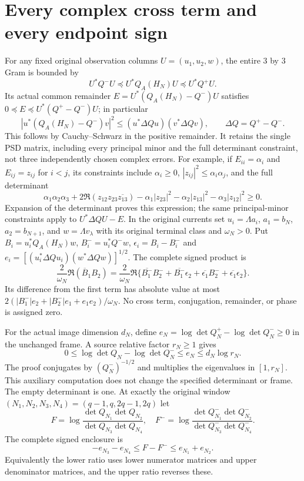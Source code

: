 \documentclass[11pt]{article}
\begin{document}
\section{Every complex cross term and every endpoint sign}

For any fixed original observation columns $U=(u_1,u_2,w)$,
the entire $3$ by $3$ Gram is bounded by
\[
 U^*Q^-U\preceq U^*Q_A(H_N)U\preceq U^*Q^+U.
\]
Its actual common remainder $E=U^*(Q_A(H_N)-Q^-)U$ satisfies
$0\preceq E\preceq U^*(Q^+-Q^-)U$; in particular
\begin{equation}\label{eq:cross}
 |u^*(Q_A(H_N)-Q^-)v|^2
 \le(u^*\Delta Q u)(v^*\Delta Q v),\qquad\Delta Q=Q^+-Q^-.
\end{equation}
This follows by Cauchy--Schwarz in the positive remainder. It
retains the single PSD matrix, including every principal minor and
the full determinant constraint, not three independently chosen
complex errors. For example, if $E_{ii}=\alpha_i$ and
$E_{ij}=z_{ij}$ for $i<j$, its constraints include $\alpha_i\ge0$,
$|z_{ij}|^2\le\alpha_i\alpha_j$, and the full determinant
\[
 \alpha_1\alpha_2\alpha_3
 +2\Re(z_{12}z_{23}\overline{z_{13}})
 -\alpha_1|z_{23}|^2-\alpha_2|z_{13}|^2-\alpha_3|z_{12}|^2
 \ge0.
\]
Expansion of the determinant proves this expression; the same
principal-minor constraints apply to $U^*\Delta Q U-E$.
In the original currents set
$u_i=\Lambda a_i$, $a_1=b_N$, $a_2=b_{N+1}$, and
$w=\Lambda v_\lambda$ with its original terminal class and
$\omega_N>0$. Put $B_i=u_i^*Q_A(H_N)w$, $B_i^-=u_i^*Q^-w$,
$\epsilon_i=B_i-B_i^-$ and
$e_i=[(u_i^*\Delta Q u_i)(w^*\Delta Q w)]^{1/2}$.
The complete signed product is
\begin{equation}\label{eq:current}
 \frac{2}{\omega_N}\Re(\overline B_1B_2)
 =\frac{2}{\omega_N}\Re\{
 \overline{B_1^-}B_2^-+\overline{B_1^-}\epsilon_2
 +\overline{\epsilon_1}B_2^-+\overline{\epsilon_1}\epsilon_2\}.
\end{equation}
Its difference from the first term has absolute value at most
$2(|B_1^-|e_2+|B_2^-|e_1+e_1e_2)/\omega_N$.
No cross term, conjugation, remainder, or phase is assigned zero.

For the actual image dimension $d_N$, define
$e_N=\log\det Q_N^+-\log\det Q_N^-\ge0$ in the unchanged
frame. A source relative factor $r_N\ge1$ gives
\begin{equation}\label{eq:logbound}
 0\le\log\det Q_N-\log\det Q_N^-\le e_N\le d_N\log r_N.
\end{equation}
The proof conjugates by $(Q_N^-)^{-1/2}$ and multiplies the
eigenvalues in $[1,r_N]$. This auxiliary computation does not
change the specified determinant or frame. The empty determinant
is one. At exactly the original window
$(N_1,N_2,N_3,N_4)=(q-1,q,2q-1,2q)$ let
\[
 F=\log\frac{\det Q_{N_1}\det Q_{N_2}}
                   {\det Q_{N_3}\det Q_{N_4}},\quad
 F^-=\log\frac{\det Q_{N_1}^-\det Q_{N_2}^-}
                     {\det Q_{N_3}^-\det Q_{N_4}^-}.
\]
The complete signed enclosure is
\begin{equation}\label{eq:four}
 \boxed{-e_{N_3}-e_{N_4}\le F-F^-
                         \le e_{N_1}+e_{N_2}.}
\end{equation}
Equivalently the lower ratio uses lower numerator matrices and
upper denominator matrices, and the upper ratio reverses these.
\end{document}
